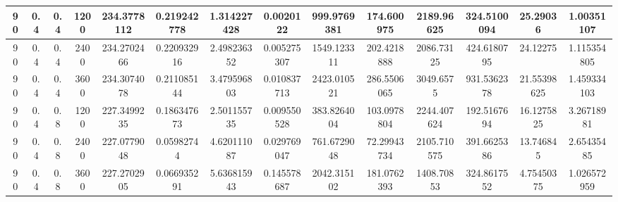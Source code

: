 \documentclass[main.tex]{subfiles}
\begin{document}
\begin{table}[ht]
\begin{tabular}{cccccccccccccc}
		\multicolumn{1}{|c|}{90} & \multicolumn{1}{c|}{0.4} & \multicolumn{1}{c|}{0.4} & \multicolumn{1}{c|}{1200} & \multicolumn{1}{c|}{234.3778112} & \multicolumn{1}{c|}{0.219242778} & \multicolumn{1}{c|}{1.314227428} & \multicolumn{1}{c|}{0.0020122}   & \multicolumn{1}{c|}{999.9769381} & \multicolumn{1}{c|}{174.600975}  & \multicolumn{1}{c|}{2189.96625}  & \multicolumn{1}{c|}{324.5100094} & \multicolumn{1}{c|}{25.29036}    & \multicolumn{1}{c|}{1.00351107}  \\ \hline
		\multicolumn{1}{|c|}{90} & \multicolumn{1}{c|}{0.4} & \multicolumn{1}{c|}{0.4} & \multicolumn{1}{c|}{2400} & \multicolumn{1}{c|}{234.2702466} & \multicolumn{1}{c|}{0.220932916} & \multicolumn{1}{c|}{2.498236352} & \multicolumn{1}{c|}{0.005275307} & \multicolumn{1}{c|}{1549.123311} & \multicolumn{1}{c|}{202.4218888} & \multicolumn{1}{c|}{2086.73125}  & \multicolumn{1}{c|}{424.6180795} & \multicolumn{1}{c|}{24.12275}    & \multicolumn{1}{c|}{1.115354805} \\ \hline
		\multicolumn{1}{|c|}{90} & \multicolumn{1}{c|}{0.4} & \multicolumn{1}{c|}{0.4} & \multicolumn{1}{c|}{3600} & \multicolumn{1}{c|}{234.3074078} & \multicolumn{1}{c|}{0.211085144} & \multicolumn{1}{c|}{3.479596803} & \multicolumn{1}{c|}{0.010837713} & \multicolumn{1}{c|}{2423.010521} & \multicolumn{1}{c|}{286.5506065} & \multicolumn{1}{c|}{3049.6575}   & \multicolumn{1}{c|}{931.5362378} & \multicolumn{1}{c|}{21.55398625} & \multicolumn{1}{c|}{1.459334103} \\ \hline
		\multicolumn{1}{|c|}{90} & \multicolumn{1}{c|}{0.4} & \multicolumn{1}{c|}{0.8} & \multicolumn{1}{c|}{1200} & \multicolumn{1}{c|}{227.3499235} & \multicolumn{1}{c|}{0.186347673} & \multicolumn{1}{c|}{2.501155735} & \multicolumn{1}{c|}{0.009550528} & \multicolumn{1}{c|}{383.8264004} & \multicolumn{1}{c|}{103.0978804} & \multicolumn{1}{c|}{2244.407624} & \multicolumn{1}{c|}{192.5167694} & \multicolumn{1}{c|}{16.1275825}  & \multicolumn{1}{c|}{3.26718981}  \\ \hline
		\multicolumn{1}{|c|}{90} & \multicolumn{1}{c|}{0.4} & \multicolumn{1}{c|}{0.8} & \multicolumn{1}{c|}{2400} & \multicolumn{1}{c|}{227.0779048} & \multicolumn{1}{c|}{0.05982744}  & \multicolumn{1}{c|}{4.620111087} & \multicolumn{1}{c|}{0.029769047} & \multicolumn{1}{c|}{761.6729048} & \multicolumn{1}{c|}{72.29943734} & \multicolumn{1}{c|}{2105.710575} & \multicolumn{1}{c|}{391.6625386} & \multicolumn{1}{c|}{13.746845}   & \multicolumn{1}{c|}{2.65435485}  \\ \hline
		90                       & 0.4                      & 0.8                      & 3600                      & 227.2702905                      & 0.066935291                      & 5.636815943                      & 0.145578687                      & 2042.315102                      & 181.0762393                      & 1408.70853                       & 324.8617552                      & 4.75450375                       & 1.026572959                      \\ \hline
	\end{tabular}
\end{table}
\end{document}
